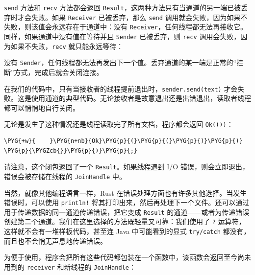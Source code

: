 \texttt{send} 方法和 \texttt{recv} 方法都会返回 \texttt{Result}，这两种方法只有当通道的另一端已被丢弃时才会失败。如果 \texttt{Receiver} 已被丢弃，那么 \texttt{send} 调用就会失败，因为如果不失败，则该值会永远存在于通道中：没有 \texttt{Receiver}，任何线程都无法再接收它。同样，如果通道中没有值在等待并且 \texttt{Sender} 已被丢弃，则 \texttt{recv} 调用会失败，因为如果不失败，\texttt{recv} 就只能永远等待：

没有 \texttt{Sender}，任何线程都无法再发出下一个值。丢弃通道的某一端是正常的“挂断”方式，完成后就会关闭连接。

在我们的代码中，只有当接收者的线程提前退出时，\texttt{sender.send(text)} 才会失败。这是使用通道的典型代码。无论接收者是故意退出还是出错退出，读取者线程都可以悄悄地自行关闭。

无论是发生了这种情况还是线程读取完了所有文档，程序都会返回 \texttt{Ok(())}：

\begin{Verbatim}[commandchars=\\\{\},breaklines=true,breakanywhere=true,fontsize=\codefont,xleftmargin=17bp]
\PYG{+w}{    }\PYG{n+nb}{Ok}\PYG{p}{(}\PYG{p}{(}\PYG{p}{)}\PYG{p}{)}
\PYG{p}{\PYGZcb{}}\PYG{p}{)}\PYG{p}{;}
\end{Verbatim}

请注意，这个闭包返回了一个 \texttt{Result}。如果线程遇到 I/O 错误，则会立即退出，错误会被存储在线程的 \texttt{JoinHandle} 中。

当然，就像其他编程语言一样，Rust 在错误处理方面也有许多其他选择。当发生错误时，可以使用 \texttt{println!} 将其打印出来，然后再处理下一个文件。还可以通过用于传递数据的同一通道传递错误，把它变成 \texttt{Result} 的通道——或者为传递错误创建第二个通道。我们在这里选择的方法既轻量又可靠：我们使用了 \texttt{?} 运算符，这样就不会有一堆样板代码，甚至连 Java 中可能看到的显式 \texttt{try/catch} 都没有，而且也不会悄无声息地传递错误。

为便于使用，程序会把所有这些代码都包装在一个函数中，该函数会返回至今尚未用到的 \texttt{receiver} 和新线程的 \texttt{JoinHandle}：

